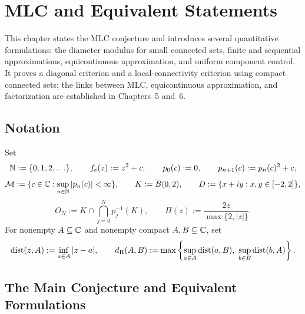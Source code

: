 \chapter{MLC and Equivalent Statements}
\noindent This chapter states the MLC conjecture and introduces several quantitative formulations: the diameter modulus for small connected sets, finite and sequential approximations, equicontinuous approximation, and uniform component control. It proves a diagonal criterion and a local-connectivity criterion using compact connected sets; the links between MLC, equicontinuous approximation, and factorization are established in Chapters~5 and~6.

\section{Notation}

Set
\[
 \mathbb N:=\{0,1,2,\ldots\},\qquad f_c(z):=z^2+c,\qquad
 p_0(c):=0,\qquad p_{n+1}(c):=p_n(c)^2+c,
\]
\[
 \mathcal M:=\{c\in\mathbb C:\sup_{n\in\mathbb N}|p_n(c)|<\infty\},\qquad
 K:=\overline B(0,2),\qquad
 D:=\{x+iy:x,y\in[-2,2]\},
\]
\[
 O_N:=K\cap\bigcap_{j=0}^{N}p_j^{-1}(K),\qquad
 \Pi(z):=\frac{2z}{\max\{2,|z|\}}.
\]
For nonempty \(A\subseteq\mathbb C\) and nonempty compact \(A,B\subseteq\mathbb C\),
set
\[
 \operatorname{dist}(z,A):=\inf_{a\in A}|z-a|,\qquad
 d_{\mathrm H}(A,B):=
 \max\left\{\sup_{a\in A}\operatorname{dist}(a,B),\
             \sup_{b\in B}\operatorname{dist}(b,A)\right\}.
\]

\section{The Main Conjecture and Equivalent Formulations}

